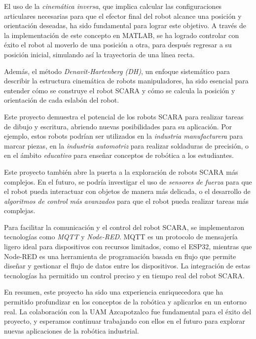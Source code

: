\documentclass[final]{foresj}
\begin{document}
El uso de la \textit{cinemática inversa}, que implica calcular las configuraciones articulares necesarias para que el efector final del robot alcance una posición y orientación deseadas, ha sido fundamental para lograr este objetivo. A través de la implementación de este concepto en MATLAB, se ha logrado controlar con éxito el robot al moverlo de una posición a otra, para después regresar a su posición inicial, simulando así la trayectoria de una línea recta.

Además, el método \textit{Denavit-Hartenberg (DH)}, un enfoque sistemático para describir la estructura cinemática de robots manipuladores, ha sido esencial para entender cómo se construye el robot SCARA y cómo se calcula la posición y orientación de cada eslabón del robot.

Este proyecto demuestra el potencial de los robots SCARA para realizar tareas de dibujo y escritura, abriendo nuevas posibilidades para su aplicación. Por ejemplo, estos robots podrían ser utilizados en la \textit{industria manufacturera} para marcar piezas, en la \textit{industria automotriz} para realizar soldaduras de precisión, o en el ámbito \textit{educativo} para enseñar conceptos de robótica a los estudiantes.

Este proyecto también abre la puerta a la exploración de robots SCARA más complejos. En el futuro, se podría investigar el uso de \textit{sensores de fuerza} para que el robot pueda interactuar con objetos de manera más delicada, o el desarrollo de \textit{algoritmos de control más avanzados} para que el robot pueda realizar tareas más complejas.

Para facilitar la comunicación y el control del robot SCARA, se implementaron tecnologías como \textit{MQTT} y \textit{Node-RED}. MQTT es un protocolo de mensajería ligero ideal para dispositivos con recursos limitados, como el ESP32, mientras que Node-RED es una herramienta de programación basada en flujo que permite diseñar y gestionar el flujo de datos entre los dispositivos. La integración de estas tecnologías ha permitido un control preciso y en tiempo real del robot SCARA.

En resumen, este proyecto ha sido una experiencia enriquecedora que ha permitido profundizar en los conceptos de la robótica y aplicarlos en un entorno real. La colaboración con la UAM Azcapotzalco fue fundamental para el éxito del proyecto, y esperamos continuar trabajando con ellos en el futuro para explorar nuevas aplicaciones de la robótica industrial.
\end{document}
